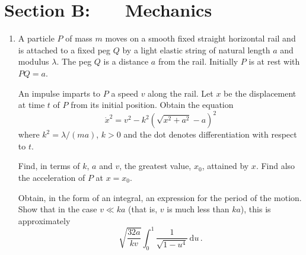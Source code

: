 \documentclass[a4, 11pt]{report}
\newlength{\qspace}
\newcounter{qnumber}
\newenvironment{question}%
 {\vspace{\qspace}
  \begin{enumerate}[\bfseries 1\quad][10]%
    \setcounter{enumi}{\value{qnumber}}%
    \item%
 }
{
  \end{enumerate}
  \filbreak
  \stepcounter{qnumber}
 }
\def\d{{\mathrm d}}
\renewcommand{\.}[1]{\ensuremath{\mathrm{#1}}}
\newcommand{\+}[1]{\ensuremath{\mathbf{#1}}}
\begin{document}
\section*{Section B: \ \ \ Mechanics}


	
\begin{question}
 A particle $P$ of mass $m$  moves on a smooth  fixed straight horizontal rail and is attached to a fixed peg $Q$ by a light elastic string of natural length $a$ and modulus $\lambda$. The peg $Q$ is a distance $a$ from the rail. Initially $P$ is at rest with $PQ=a$. 
 
 
 An impulse imparts to $P$ a speed $v$ along the rail. Let $x$ be the displacement at time $t$ of $P$ from its initial position. Obtain the equation
\[
\dot x^2  = v^2 - k^2 \left( \sqrt{x^2+a^2} -a\right)^{\!2}
\]
where $ k^2 = \lambda/(ma)$,  $k>0$ and the dot denotes differentiation with respect to $t$.

Find, in terms of $k$, $a$ and $v$, the greatest value, $x_0$, attained by $x$. Find also the acceleration of $P$ at $x=x_0$.

Obtain, in the form of an integral, an expression for the period of the motion. Show that in the case $v\ll ka$ (that is, $v$ is much less than $ka$), this is approximately
\[
\sqrt {\frac {32a}{kv}}
\int_0^1 \frac 1 {\sqrt{1-u^4}} \, \d u \, .
\]
	\end{question}
	
\end{document}
